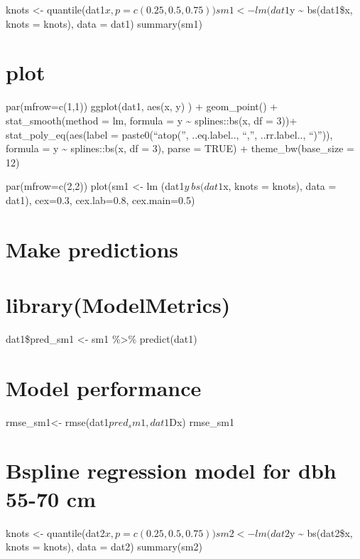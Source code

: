 \documentclass[
]{article}
\begin{document}
knots \textless-
quantile(dat1\(x, p = c(0.25, 0.5, 0.75)) sm1 <- lm (dat1\)y
\textasciitilde{} bs(dat1\$x, knots = knots), data = dat1) summary(sm1)

\hypertarget{plot}{%
\section{plot}\label{plot}}

par(mfrow=c(1,1)) ggplot(dat1, aes(x, y) ) + geom\_point() +
stat\_smooth(method = lm, formula = y \textasciitilde{} splines::bs(x,
df = 3))+ stat\_poly\_eq(aes(label = paste0(``atop('', ..eq.label..,
``,'', ..rr.label.., ``)'')), formula = y \textasciitilde{}
splines::bs(x, df = 3), parse = TRUE) + theme\_bw(base\_size = 12)

par(mfrow=c(2,2)) plot(sm1 \textless- lm (dat1\(y ~ bs(dat1\)x, knots =
knots), data = dat1), cex=0.3, cex.lab=0.8, cex.main=0.5)

\hypertarget{make-predictions-6}{%
\section{Make predictions}\label{make-predictions-6}}

\hypertarget{librarymodelmetrics-6}{%
\section{library(ModelMetrics)}\label{librarymodelmetrics-6}}

dat1\$pred\_sm1 \textless- sm1 \%\textgreater\% predict(dat1)

\hypertarget{model-performance}{%
\section{Model performance}\label{model-performance}}

rmse\_sm1\textless- rmse(dat1\(pred_sm1, dat1\)Dx) rmse\_sm1

\hypertarget{bspline-regression-model-for-dbh-55-70-cm}{%
\section{Bspline regression model for dbh 55-70
cm}\label{bspline-regression-model-for-dbh-55-70-cm}}

knots \textless-
quantile(dat2\(x, p = c(0.25, 0.5, 0.75)) sm2 <- lm (dat2\)y
\textasciitilde{} bs(dat2\$x, knots = knots), data = dat2) summary(sm2)
\end{document}

